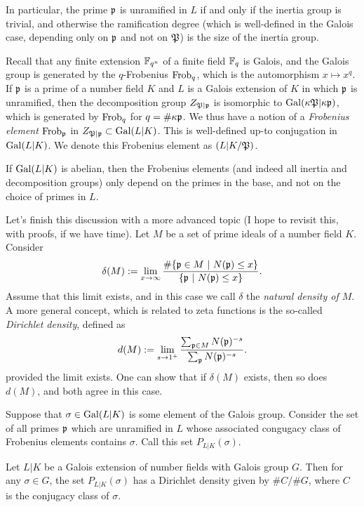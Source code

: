 In particular, the prime $\mathfrak{p}$ is unramified in $L$ if and only if the inertia group is trivial, and otherwise the ramification degree (which is well-defined in the Galois case, depending only on $\mathfrak{p}$ and not on $\mathfrak{P}$) is the size of the inertia group.

Recall that any finite extension $\mathbb{F}_{q^{n}}$ of a finite field $\mathbb{F}_{q}$ is Galois, and the Galois group is generated by the $q$-Frobenius $\operatorname{Frob}_{q}$, which is the automorphism $x \mapsto x^{q}$.
If $\mathfrak{p}$ is a prime of a number field $K$ and $L$ is a Galois extension of $K$ in which $\mathfrak{p}$ is unramified, then the decomposition group $Z_{\mathfrak{P}|\mathfrak{p}}$ is isomorphic to $\operatorname{Gal}(\kappa\mathfrak{P}|\kappa\mathfrak{p})$, which is generated by $\operatorname{Frob}_{q}$ for $q = \#\kappa\mathfrak{p}$.
We thus have a notion of a \emph{Frobenius element} $\operatorname{Frob}_{\mathfrak{p}}$ in $Z_{\mathfrak{P}|\mathfrak{p}} \subset \operatorname{Gal}(L|K)$.
This is well-defined up-to conjugation in $\operatorname{Gal}(L|K)$.
We denote this Frobenius element as $(L|K/\mathfrak{P})$.

\begin{remark}
  If $\operatorname{Gal}(L|K)$ is abelian, then the Frobenius elements (and indeed all inertia and decomposition groups) only depend on the primes in the base, and not on the choice of primes in $L$.
\end{remark}

Let's finish this discussion with a more advanced topic (I hope to revisit this, with proofs, if we have time).
Let $M$ be a set of prime ideals of a number field $K$.
Consider
\[ \delta(M) := \lim_{x \to \infty} \frac{\#\{\mathfrak{p} \in M \ | \ N(\mathfrak{p}) \le x\}}{\{\mathfrak{p} \ | \ N(\mathfrak{p}) \le x\}}. \]
Assume that this limit exists, and in this case we call $\delta$ the \emph{natural density of $M$}.
A more general concept, which is related to zeta functions is the so-called \emph{Dirichlet density}, defined as
\[ d(M) := \lim_{s \to 1^{+}} \frac{\sum_{\mathfrak{p} \in M} N(\mathfrak{p})^{-s}}{\sum_{\mathfrak{p}} N(\mathfrak{p})^{-s}}.  \]
provided the limit exists.
One can show that if $\delta(M)$ exists, then so does $d(M)$, and both agree in this case.

Suppose that $\sigma \in \operatorname{Gal}(L|K)$ is some element of the Galois group.
Consider the set of all primes $\mathfrak{p}$ which are unramified in $L$ whose associated congugacy class of Frobenius elements contains $\sigma$.
Call this set $P_{L|K}(\sigma)$.

\begin{theorem}
  Let $L|K$ be a Galois extension of number fields with Galois group $G$.
  Then for any $\sigma \in G$, the set $P_{L|K}(\sigma)$ has a Dirichlet density given by $\# C / \# G$, where $C$ is the conjugacy class of $\sigma$.
\end{theorem}

